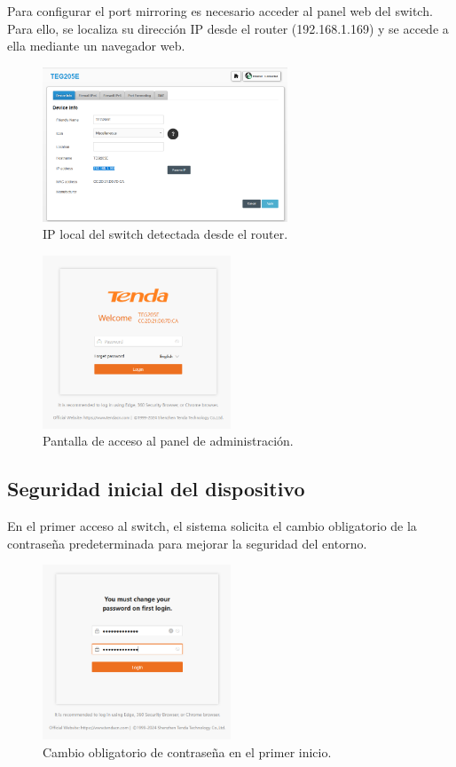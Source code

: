 \documentclass[11pt,a4paper,twoside]{report}
\begin{document}
Para configurar el port mirroring es necesario acceder al panel web del switch. Para ello, se localiza su dirección IP desde el router (192.168.1.169) y se accede a ella mediante un navegador web.

\begin{figure}[H]
	\centering
	\includegraphics[width=0.65\textwidth]{pruebas_config/4-localizar_tenda.png}
	\caption{IP local del switch detectada desde el router.}
\end{figure}

\begin{figure}[H]
	\centering
	\includegraphics[width=0.5\textwidth]{pruebas_config/5-tenda_web.png}
	\caption{Pantalla de acceso al panel de administración.}
\end{figure}

\subsection*{Seguridad inicial del dispositivo}

En el primer acceso al switch, el sistema solicita el cambio obligatorio de la contraseña predeterminada para mejorar la seguridad del entorno.

\begin{figure}[H]
	\centering
	\includegraphics[width=0.5\textwidth]{pruebas_config/6-cambio_pass_tenda.png}
	\caption{Cambio obligatorio de contraseña en el primer inicio.}
\end{figure}
\end{document}
